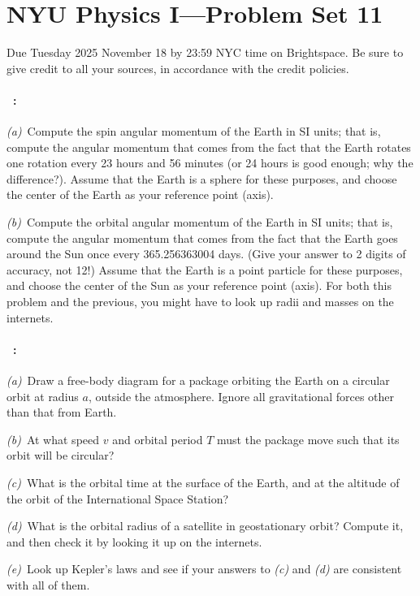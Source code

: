 \documentclass[12pt]{article}
\begin{document}
\section*{NYU Physics I---Problem Set 11}

Due Tuesday 2025 November 18 by 23:59 NYC time on Brightspace.
Be sure to give credit to all your sources, in accordance with the credit
policies.

\paragraph{\problemname~\theproblem:}%
\textsl{(a)}~Compute the spin angular momentum of the Earth in SI
units; that is, compute the angular momentum that comes from the fact
that the Earth rotates one rotation every 23 hours and 56 minutes (or
24 hours is good enough; why the difference?). Assume that the Earth
is a sphere for these purposes, and choose the center of the Earth as
your reference point (axis).

\textsl{(b)}~Compute the orbital angular momentum of the Earth in SI
units; that is, compute the angular momentum that comes from the fact
that the Earth goes around the Sun once every 365.256363004
days. (Give your answer to 2 digits of accuracy, not 12!) Assume that
the Earth is a point particle for these purposes, and choose the
center of the Sun as your reference point (axis). For both this
problem and the previous, you might have to look up radii and masses
on the internets.

\paragraph{\problemname~\theproblem:}\label{package}%
\textsl{(a)}~Draw a free-body diagram for a package orbiting the Earth
on a circular orbit at radius $a$, outside the atmosphere. Ignore all
gravitational forces other than that from Earth.

\textsl{(b)}~At what speed $v$ and orbital period $T$ must the package
move such that its orbit will be circular?

\textsl{(c)}~What is the orbital time at the surface of the Earth, and
at the altitude of the orbit of the International Space Station?

\textsl{(d)}~What is the orbital radius of a satellite in geostationary
orbit? Compute it, and then check it by looking it up on the internets.

\textsl{(e)}~Look up Kepler's laws and see if your answers to
\textsl{(c)} and \textsl{(d)} are consistent with all of them.
\end{document}

